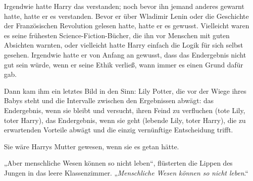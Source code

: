 Irgendwie hatte Harry das verstanden; noch bevor ihn jemand anderes gewarnt hatte, hatte er es verstanden. Bevor er über Wladimir Lenin oder die Geschichte der Französischen Revolution gelesen hatte, hatte er es gewusst. Vielleicht waren es seine frühesten Science-Fiction-Bücher, die ihn vor Menschen mit guten Absichten warnten, oder vielleicht hatte Harry einfach die Logik für sich selbst gesehen. Irgendwie hatte er von Anfang an gewusst, dass das Endergebnis nicht gut sein würde, wenn er seine Ethik verließ, wann immer es einen Grund dafür gab.

Dann kam ihm ein letztes Bild in den Sinn: Lily Potter, die vor der Wiege ihres Babys steht und die Intervalle zwischen den Ergebnissen abwägt: das Endergebnis, wenn sie bleibt und versucht, ihren Feind zu verfluchen (tote Lily, toter Harry), das Endergebnis, wenn sie geht (lebende Lily, toter Harry), die zu erwartenden Vorteile abwägt und die einzig vernünftige Entscheidung trifft.

Sie wäre Harrys Mutter gewesen, wenn sie es getan hätte.

„Aber menschliche Wesen können so nicht leben“, flüsterten die Lippen des Jungen in das leere Klassenzimmer.
„\emph{Menschliche Wesen können so nicht leben}.“

